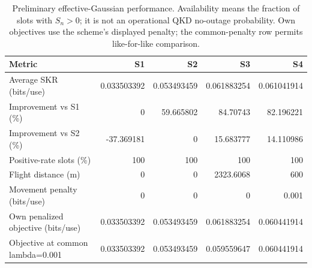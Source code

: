 \begin{table}[t]
\caption{Preliminary effective-Gaussian performance. Availability means the fraction of slots with $S_n>0$; it is not an operational QKD no-outage probability. Own objectives use the scheme's displayed penalty; the common-penalty row permits like-for-like comparison.}
\label{tab:mobility_performance}
\centering\footnotesize
\begin{tabular}{lrrrr}\hline
Metric & S1 & S2 & S3 & S4 \\ \hline
Average SKR (bits/use) & 0.033503392 & 0.053493459 & 0.061883254 & 0.061041914 \\
Improvement vs S1 (\%) & 0 & 59.665802 & 84.70743 & 82.196221 \\
Improvement vs S2 (\%) & -37.369181 & 0 & 15.683777 & 14.110986 \\
Positive-rate slots (\%) & 100 & 100 & 100 & 100 \\
Flight distance (m) & 0 & 0 & 2323.6068 & 600 \\
Movement penalty (bits/use) & 0 & 0 & 0 & 0.001 \\
Own penalized objective (bits/use) & 0.033503392 & 0.053493459 & 0.061883254 & 0.060441914 \\
Objective at common lambda=0.001 & 0.033503392 & 0.053493459 & 0.059559647 & 0.060441914 \\
\hline\end{tabular}
\end{table}
